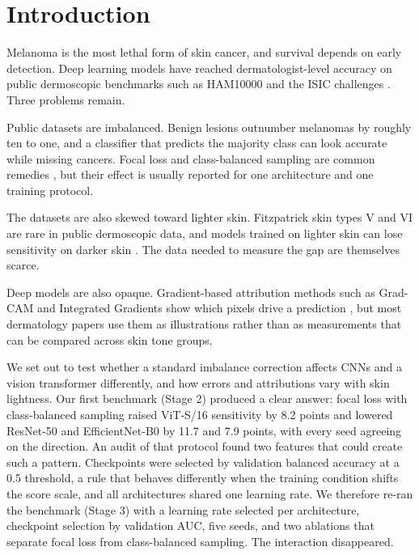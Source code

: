 \section{Introduction}

Melanoma is the most lethal form of skin cancer, and survival depends on early detection. Deep learning models have reached dermatologist-level accuracy on public dermoscopic benchmarks such as HAM10000 and the ISIC challenges \citep{tschandl2018ham10000,codella2018isic}. Three problems remain.

Public datasets are imbalanced. Benign lesions outnumber melanomas by roughly ten to one, and a classifier that predicts the majority class can look accurate while missing cancers. Focal loss and class-balanced sampling are common remedies \citep{lin2017focal}, but their effect is usually reported for one architecture and one training protocol.

The datasets are also skewed toward lighter skin. Fitzpatrick skin types V and VI are rare in public dermoscopic data, and models trained on lighter skin can lose sensitivity on darker skin \citep{groh2021fitzpatrick17k,daneshjou2022ddi,ruga2026pipsqueak}. The data needed to measure the gap are themselves scarce.

Deep models are also opaque. Gradient-based attribution methods such as Grad-CAM and Integrated Gradients show which pixels drive a prediction \citep{selvaraju2017gradcam,sundararajan2017ig}, but most dermatology papers use them as illustrations rather than as measurements that can be compared across skin tone groups.

We set out to test whether a standard imbalance correction affects CNNs and a vision transformer differently, and how errors and attributions vary with skin lightness. Our first benchmark (Stage 2) produced a clear answer: focal loss with class-balanced sampling raised ViT-S/16 sensitivity by 8.2 points and lowered ResNet-50 and EfficientNet-B0 by 11.7 and 7.9 points, with every seed agreeing on the direction. An audit of that protocol found two features that could create such a pattern. Checkpoints were selected by validation balanced accuracy at a 0.5 threshold, a rule that behaves differently when the training condition shifts the score scale, and all architectures shared one learning rate. We therefore re-ran the benchmark (Stage 3) with a learning rate selected per architecture, checkpoint selection by validation AUC, five seeds, and two ablations that separate focal loss from class-balanced sampling. The interaction disappeared.

